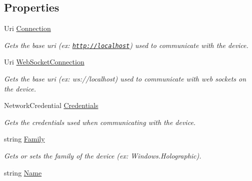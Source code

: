 \subsection*{Properties}
\begin{DoxyCompactItemize}
\item 
Uri \hyperlink{interface_microsoft_1_1_tools_1_1_windows_device_portal_1_1_i_device_portal_connection_a555066dca787a09572a26c635baf0ccc}{Connection}
\begin{DoxyCompactList}\small\item\em Gets the base uri (ex\+: \href{http://localhost}{\tt http\+://localhost}) used to communicate with the device. \end{DoxyCompactList}\item 
Uri \hyperlink{interface_microsoft_1_1_tools_1_1_windows_device_portal_1_1_i_device_portal_connection_aed3a7ffef88f50ce557d8821e82e30a7}{Web\+Socket\+Connection}
\begin{DoxyCompactList}\small\item\em Gets the base uri (ex\+: ws\+://localhost) used to communicate with web sockets on the device. \end{DoxyCompactList}\item 
Network\+Credential \hyperlink{interface_microsoft_1_1_tools_1_1_windows_device_portal_1_1_i_device_portal_connection_a1df2b17dbb264c11c38fe5ef50c2fa2c}{Credentials}
\begin{DoxyCompactList}\small\item\em Gets the credentials used when communicating with the device. \end{DoxyCompactList}\item 
string \hyperlink{interface_microsoft_1_1_tools_1_1_windows_device_portal_1_1_i_device_portal_connection_abd1b399569dab868e0631a6f205b31e8}{Family}
\begin{DoxyCompactList}\small\item\em Gets or sets the family of the device (ex\+: Windows.\+Holographic). \end{DoxyCompactList}\item 
string \hyperlink{interface_microsoft_1_1_tools_1_1_windows_device_portal_1_1_i_device_portal_connection_add6a3eff011b1a289a6449c0fdadb0b0}{Name}

\end{DoxyCompactItemize}
